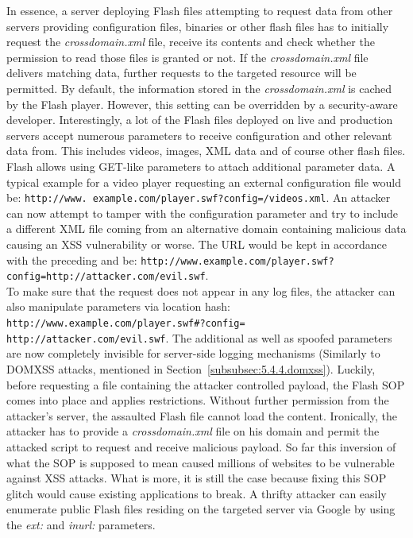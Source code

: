       In essence, a server deploying Flash files attempting to request data from other servers providing configuration files, binaries or other flash files has to initially request the \textit{crossdomain.xml} file, receive its contents and check whether the permission to read those files is granted or not. If the \textit{crossdomain.xml} file delivers matching data, further requests to the targeted resource will be permitted. By default, the information stored in the \textit{crossdomain.xml} is cached by the Flash player. However, this setting can be overridden by a security-aware developer. Interestingly, a lot of the Flash files deployed on live and production servers accept numerous parameters to receive configuration and other relevant data from. This includes videos, images, XML data and of course other flash files. Flash allows using GET-like parameters to attach additional parameter data. A typical example for a video player requesting an external configuration file would be: \texttt{http://www.
example.com/player.swf?config=/videos.xml}. An attacker can now attempt to tamper with the configuration parameter and try to include a different XML file coming from an alternative domain containing malicious data causing an XSS vulnerability or worse. The URL would be kept in accordance with the preceding and be: \texttt{http://www.example.com/player.swf?config=http://attacker.com/evil.swf}.\\
 To make sure that the request does not appear in any log files, the attacker can also manipulate parameters via location hash: \texttt{http://www.example.com/player.swf\#?config=\\
http://attacker.com/evil.swf}. 
      The additional as well as spoofed parameters are now completely invisible for server-side logging mechanisms (Similarly to DOMXSS attacks, mentioned in Section~\ref{subsubsec:5.4.4.domxss}). Luckily, before requesting a file containing the attacker controlled payload, the Flash SOP comes into place and applies restrictions. Without further permission from the attacker's server, the assaulted Flash file cannot load the content. Ironically, the attacker has to provide a \textit{crossdomain.xml} file on his domain and permit the attacked script to request and receive malicious payload. So far this inversion of what the SOP is supposed to mean caused millions of websites to be vulnerable against XSS attacks. What is more, it is still the case because fixing this SOP glitch would cause existing applications to break. A thrifty attacker can easily enumerate public Flash files residing on the targeted server via Google by using the \textit{ext:} and \textit{inurl:} parameters. \\

